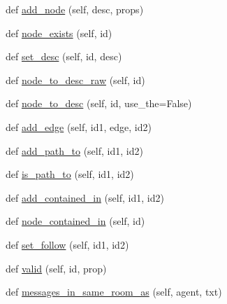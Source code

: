 \begin{DoxyCompactItemize}
def \hyperlink{classmastering__the__dungeon_1_1tasks_1_1graph__world2_1_1graph_1_1Graph_a506ee7f9d07c8c6b63d59d73d50ffe72}{add\+\_\+node} (self, desc, props)
\item 
def \hyperlink{classmastering__the__dungeon_1_1tasks_1_1graph__world2_1_1graph_1_1Graph_a04d9e981dfe42dd636a17e808f7821cc}{node\+\_\+exists} (self, id)
\item 
def \hyperlink{classmastering__the__dungeon_1_1tasks_1_1graph__world2_1_1graph_1_1Graph_ac75e6e8afd506f1cfbcc4f540891ce87}{set\+\_\+desc} (self, id, desc)
\item 
def \hyperlink{classmastering__the__dungeon_1_1tasks_1_1graph__world2_1_1graph_1_1Graph_a3d1c3b4c1ddc901d6b6d7dd59c9b1399}{node\+\_\+to\+\_\+desc\+\_\+raw} (self, id)
\item 
def \hyperlink{classmastering__the__dungeon_1_1tasks_1_1graph__world2_1_1graph_1_1Graph_adc2e8672dfe5637ef7f2bd5a2d9c9083}{node\+\_\+to\+\_\+desc} (self, id, use\+\_\+the=False)
\item 
def \hyperlink{classmastering__the__dungeon_1_1tasks_1_1graph__world2_1_1graph_1_1Graph_a78dc1fba5fc546807936ce27be6eecf9}{add\+\_\+edge} (self, id1, edge, id2)
\item 
def \hyperlink{classmastering__the__dungeon_1_1tasks_1_1graph__world2_1_1graph_1_1Graph_a1eda56c20f83b99104e941902d828b04}{add\+\_\+path\+\_\+to} (self, id1, id2)
\item 
def \hyperlink{classmastering__the__dungeon_1_1tasks_1_1graph__world2_1_1graph_1_1Graph_a13eacdd0c2f6a903a63386016d165344}{is\+\_\+path\+\_\+to} (self, id1, id2)
\item 
def \hyperlink{classmastering__the__dungeon_1_1tasks_1_1graph__world2_1_1graph_1_1Graph_a38881cfb7d3d74d4a0cb130f946e715e}{add\+\_\+contained\+\_\+in} (self, id1, id2)
\item 
def \hyperlink{classmastering__the__dungeon_1_1tasks_1_1graph__world2_1_1graph_1_1Graph_ad7537af58a534364e66ca5f22391d883}{node\+\_\+contained\+\_\+in} (self, id)
\item 
def \hyperlink{classmastering__the__dungeon_1_1tasks_1_1graph__world2_1_1graph_1_1Graph_a2ff0825e34c0894b86cef3a5076348ed}{set\+\_\+follow} (self, id1, id2)
\item 
def \hyperlink{classmastering__the__dungeon_1_1tasks_1_1graph__world2_1_1graph_1_1Graph_a28bc1686c8844b4d8071db8b3bd1444a}{valid} (self, id, prop)
\item 
def \hyperlink{classmastering__the__dungeon_1_1tasks_1_1graph__world2_1_1graph_1_1Graph_ab1f0ec6ea5faeb9dfcaa40b50d007649}{messages\+\_\+in\+\_\+same\+\_\+room\+\_\+as} (self, agent, txt)

\end{DoxyCompactItemize}
